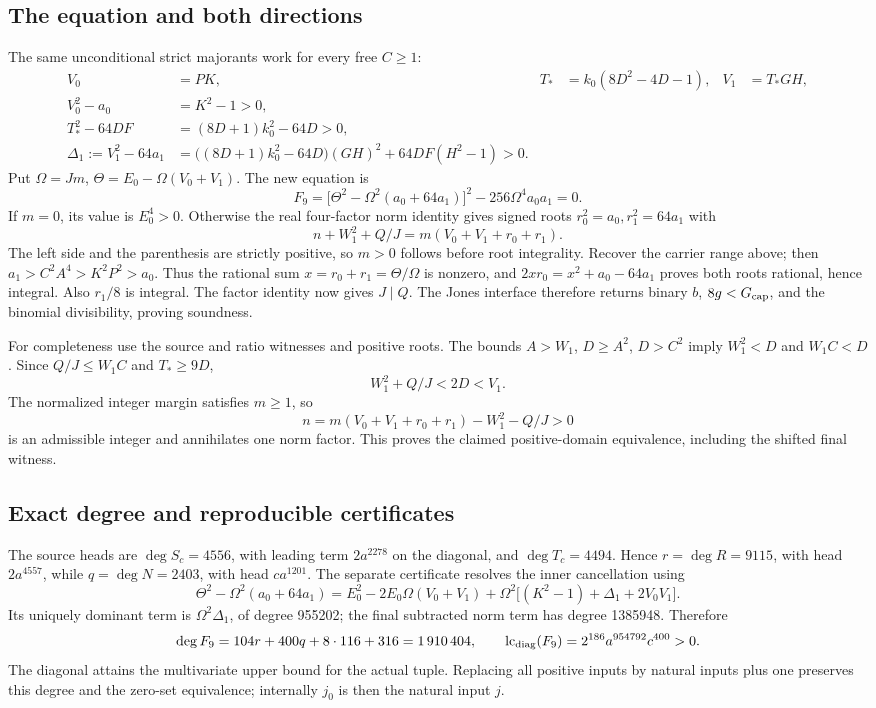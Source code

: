 \subsection{The equation and both directions}
The same unconditional strict majorants work for every free \(C\ge1\):
\begin{align*}
 V_0&=PK,&T_*&=k_0(8D^2-4D-1),&V_1&=T_*GH,\\
 V_0^2-a_0&=K^2-1>0,\\
 T_*^2-64DF&=(8D+1)k_0^2-64D>0,\\
 \Delta_1:=V_1^2-64a_1
 &=\bigl((8D+1)k_0^2-64D\bigr)(GH)^2+64DF(H^2-1)>0.
\end{align*}
Put \(\Omega=Jm\), \(\Theta=E_0-\Omega(V_0+V_1)\). The new equation is
\[
 \boxed{\ F_9=\bigl[\Theta^2-\Omega^2(a_0+64a_1)\bigr]^2
                 -256\Omega^4a_0a_1=0.\ }
\]
If \(m=0\), its value is \(E_0^4>0\). Otherwise the real four-factor
norm identity gives signed roots \(r_0^2=a_0,r_1^2=64a_1\) with
\[
 n+W_1^2+Q/J=m(V_0+V_1+r_0+r_1).
\]
The left side and the parenthesis are strictly positive, so \(m>0\)
follows before root integrality. Recover the carrier range above; then
\(a_1>C^2A^4>K^2P^2>a_0\). Thus the rational sum
\(x=r_0+r_1=\Theta/\Omega\) is nonzero, and
\(2xr_0=x^2+a_0-64a_1\) proves both roots rational, hence integral.
Also \(r_1/8\) is integral. The factor identity now gives \(J\mid Q\).
The Jones interface therefore returns binary \(b\), \(8g<G_{\rm cap}\),
and the binomial divisibility, proving soundness.

For completeness use the source and ratio witnesses and positive roots.
The bounds \(A>W_1\), \(D\ge A^2\), \(D>C^2\) imply
\(W_1^2<D\) and \(W_1C<D\). Since \(Q/J\le W_1C\) and
\(T_*\ge9D\),
\[
 W_1^2+Q/J<2D<V_1.
\]
The normalized integer margin satisfies \(m\ge1\), so
\[
 n=m(V_0+V_1+r_0+r_1)-W_1^2-Q/J>0
\]
is an admissible integer and annihilates one norm factor. This proves the
claimed positive-domain equivalence, including the shifted final witness.

\subsection{Exact degree and reproducible certificates}
The source heads are \(\deg S_c=4556\), with leading term \(2a^{2278}\)
on the diagonal, and \(\deg T_c=4494\). Hence
\(r=\deg R=9115\), with head \(2a^{4557}\), while
\(q=\deg N=2403\), with head \(ca^{1201}\). The separate certificate
resolves the inner cancellation using
\[
 \Theta^2-\Omega^2(a_0+64a_1)
 =E_0^2-2E_0\Omega(V_0+V_1)
  +\Omega^2\bigl[(K^2-1)+\Delta_1+2V_0V_1\bigr].
\]
Its uniquely dominant term is \(\Omega^2\Delta_1\), of degree 955202;
the final subtracted norm term has degree 1385948. Therefore
\[
 \deg F_9=104r+400q+8\cdot116+316=1\,910\,404,
 \qquad \operatorname{lc}_{\rm diag}(F_9)=2^{186}a^{954792}c^{400}>0.
\]
The diagonal attains the multivariate upper bound for the actual tuple.
Replacing all positive inputs by natural inputs plus one preserves this
degree and the zero-set equivalence; internally \(j_0\) is then the natural
input \(j\).

